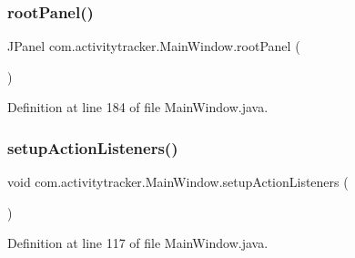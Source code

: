 \subsubsection{\texorpdfstring{rootPanel()}{rootPanel()}}
{\footnotesize\ttfamily J\+Panel com.\+activitytracker.\+Main\+Window.\+root\+Panel (\begin{DoxyParamCaption}{ }\end{DoxyParamCaption})\hspace{0.3cm}{\ttfamily [package]}}



Definition at line 184 of file Main\+Window.\+java.


\begin{DoxyCode}{0}

\end{DoxyCode}
\mbox{\label{classcom_1_1activitytracker_1_1_main_window_a76b3e8567b228ccd26f09c15ebaddb72}} 
\subsubsection{\texorpdfstring{setupActionListeners()}{setupActionListeners()}}
{\footnotesize\ttfamily void com.\+activitytracker.\+Main\+Window.\+setup\+Action\+Listeners (\begin{DoxyParamCaption}{ }\end{DoxyParamCaption})\hspace{0.3cm}{\ttfamily [private]}}



Definition at line 117 of file Main\+Window.\+java.


